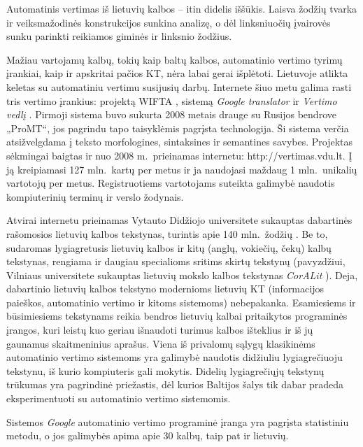 \begin{multicols}{2}
Automatinis vertimas iš lietuvių kalbos – itin didelis iššūkis. Laisva žodžių tvarka ir veiksmažodinės konstrukcijos sunkina analizę, o dėl linksniuočių įvairovės sunku parinkti reikiamos giminės ir linksnio žodžius.   

    Mažiau vartojamų kalbų, tokių kaip baltų kalbos, automatinio vertimo tyrimų įrankiai, kaip ir apskritai pačios KT, nėra labai gerai išplėtoti. Lietuvoje atlikta keletas su automatiniu vertimu susijusių darbų. Internete šiuo metu galima rasti tris vertimo įrankius: projektą WIFTA \cite{vertvdu},  sistemą \textit{Google translator} ir \textit{Vertimo vedlį} \cite{mvlab}. Pirmoji sistema buvo sukurta 2008 metais drauge su Rusijos bendrove „ProMT“, jos pagrindu tapo taisyklėmis pagrįsta technologija. Ši sistema verčia atsižvelgdama į teksto morfologines, sintaksines ir semantines savybes. Projektas sėkmingai baigtas ir nuo 2008 m.~prieinamas internetu: http://vertimas.vdu.lt. Į ją kreipiamasi 127 mln.~kartų per metus ir ja naudojasi maždaug 1 mln.~unikalių vartotojų per metus. Registruotiems vartotojams suteikta galimybė naudotis kompiuterinių terminų ir verslo žodynais.

   Atvirai internetu prieinamas Vytauto Didžiojo universitete sukauptas dabartinės rašomosios lietuvių kalbos tekstynas, turintis apie 140 mln.~žodžių \cite{tekstynas}.  Be to, sudaromas lygiagretusis lietuvių kalbos ir kitų (anglų, vokiečių, čekų) kalbų tekstynas, rengiama ir daugiau specialioms sritims skirtų tekstynų (pavyzdžiui, Vilniaus universitete sukauptas lietuvių mokslo kalbos tekstynas \textit{CorALit} \cite{coralit}). Deja, dabartinio lietuvių kalbos tekstyno modernioms lietuvių KT (informacijos paieškos, automatinio vertimo ir kitoms sistemoms) nebepakanka. Esamiesiems ir būsimiesiems tekstynams reikia bendros lietuvių kalbai pritaikytos programinės įrangos, kuri leistų kuo geriau išnaudoti turimus kalbos išteklius ir iš jų gaunamus skaitmeninius aprašus. Viena iš privalomų sąlygų klasikinėms automatinio vertimo sistemoms yra galimybė naudotis didžiuliu lygiagrečiuoju tekstynu, iš kurio kompiuteris gali mokytis. Didelių lygiagrečiųjų tekstynų trūkumas yra pagrindinė priežastis, dėl kurios Baltijos šalys tik dabar pradeda eksperimentuoti su automatinio vertimo sistemomis.   

    Sistemos \textit{Google} automatinio vertimo programinė įranga yra pagrįsta statistiniu metodu, o jos galimybės apima apie 30 kalbų, taip pat ir lietuvių.   


\end{multicols}
